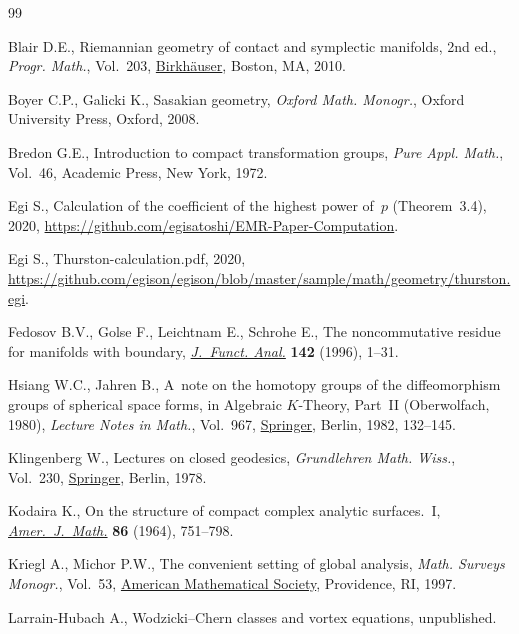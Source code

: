 \documentclass[pdftex]{sigma}
\numberwithin{equation}{section}
\theoremstyle{definition}
\begin{document}
\begin{thebibliography}{99}
\footnotesize\itemsep=0pt

Blair D.E., Riemannian geometry of contact and symplectic manifolds, 2nd ed., \textit{Progr. Math.}, Vol.~203,
 \href{https://doi.org/10.1007/978-0-8176-4959-3}{Birkh\"auser}, Boston, MA,
 2010.

Boyer C.P., Galicki K., Sasakian geometry, \textit{Oxford Math. Monogr.}, Oxford
 University Press, Oxford, 2008.

Bredon G.E., Introduction to compact transformation groups, \textit{Pure Appl.
 Math.}, Vol.~46, Academic Press, New York, 1972.

Egi S., Calculation of the coefficient of the highest power of~$p$
 ({T}heorem~3.4), 2020,
 \url{https://github.com/egisatoshi/EMR-Paper-Computation}.

Egi S., {T}hurston-calculation.pdf, 2020,
 \url{https://github.com/egison/egison/blob/master/sample/math/geometry/thurston.egi}.

Fedosov B.V., Golse F., Leichtnam E., Schrohe E., The noncommutative residue
 for manifolds with boundary,
 \href{https://doi.org/10.1006/jfan.1996.0142}{\textit{J.~Funct. Anal.}}
 \textbf{142} (1996), 1--31.

Hsiang W.C., Jahren B., A~note on the homotopy groups of the diffeomorphism
 groups of spherical space forms, in Algebraic {$K$}-Theory, {P}art~{II}
 ({O}berwolfach, 1980), \textit{Lecture Notes in Math.}, Vol.~967,
 \href{https://doi.org/10.1007/BFb0061901}{Springer}, Berlin, 1982, 132--145.

Klingenberg W., Lectures on closed geodesics, \textit{Grundlehren Math. Wiss.},
 Vol.~230, \href{https://doi.org/10.1007/978-3-642-61881-9}{Springer}, Berlin,
 1978.

Kodaira K., On the structure of compact complex analytic surfaces.~{I},
 \href{https://doi.org/10.2307/2373157}{\textit{Amer.~J.~Math.}} \textbf{86}
 (1964), 751--798.

Kriegl A., Michor P.W., The convenient setting of global analysis,
 \textit{Math. Surveys Monogr.}, Vol.~53,
 \href{https://doi.org/10.1090/surv/053}{American Mathematical Society},
 Providence, RI, 1997.

Larrain-Hubach A., Wodzicki--{C}hern classes and vortex equations,
 {u}npublished.


\end{thebibliography}
\end{document}
